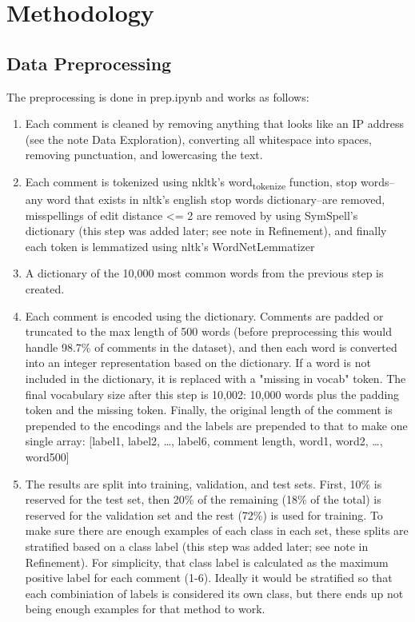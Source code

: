 \documentclass[12pt]{article}
\begin{document}
\section*{Methodology}
\label{sec:orga418e01}

\subsection*{Data Preprocessing}
\label{sec:orgf7ec694}
The preprocessing is done in prep.ipynb and works as follows:
\begin{enumerate}
\item Each comment is cleaned by removing anything that looks like an IP address (see the note Data Exploration), converting all whitespace into spaces, removing punctuation, and lowercasing the text.
\item Each comment is tokenized using nkltk's word\textsubscript{tokenize} function, stop words--any word that exists in nltk's english stop words dictionary--are removed, misspellings of edit distance <= 2 are removed by using SymSpell's dictionary (this step was added later; see note in Refinement), and finally each token is lemmatized using nltk's WordNetLemmatizer
\item A dictionary of the 10,000 most common words from the previous step is created.
\item Each comment is encoded using the dictionary. Comments are padded or truncated to the max length of 500 words (before preprocessing this would handle 98.7\% of comments in the dataset), and then each word is converted into an integer representation based on the dictionary. If a word is not included in the dictionary, it is replaced with a "missing in vocab" token. The final vocabulary size after this step is 10,002: 10,000 words plus the padding token and the missing token. Finally, the original length of the comment is prepended to the encodings and the labels are prepended to that to make one single array: [label1, label2, \ldots{}, label6, comment length, word1, word2, \ldots{}, word500]
\item The results are split into training, validation, and test sets. First, 10\% is reserved for the test set, then 20\% of the remaining (18\% of the total) is reserved for the validation set and the rest (72\%) is used for training. To make sure there are enough examples of each class in each set, these splits are stratified based on a class label (this step was added later; see note in Refinement). For simplicity, that class label is calculated as the maximum positive label for each comment (1-6). Ideally it would be stratified so that each combiniation of labels is considered its own class, but there ends up not being enough examples for that method to work.
\end{enumerate}
\end{document}
